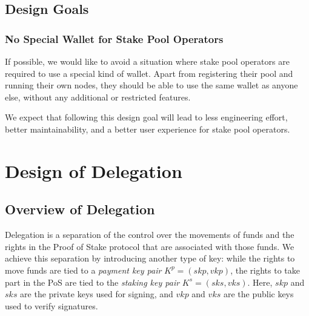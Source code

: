 \documentclass[11pt,a4paper]{article}
\begin{document}
\subsection{Design Goals}
\label{design-goals}

\subsubsection{No Special Wallet for Stake Pool Operators}
\label{no-special-wallet-for-stake-pool-operators}

If possible, we would like to avoid a situation where stake pool
operators are required to use a special kind of wallet. Apart from
registering their pool and running their own nodes, they should be able
to use the same wallet as anyone else, without any additional or
restricted features.

We expect that following this design goal will lead to less engineering
effort, better maintainability, and a better user experience for stake
pool operators.

\section{Design of Delegation}
\label{design-of-delegation}

\newcommand{\hash}[1]{\mathcal{H}(#1)}

\subsection{Overview of Delegation}
\label{overview-of-delegation}

Delegation is a separation of the control over the movements of funds
and the rights in the Proof of Stake protocol that are associated with
those funds. We achieve this separation by introducing another type of
key: while the rights to move funds are tied to a \emph{payment key
pair} \(K^p=(skp, vkp)\), the rights to take part in the PoS are tied to
the \emph{staking key pair} \(K^s=(sks, vks)\). Here, \(skp\) and
\(sks\) are the private keys used for signing, and \(vkp\) and \(vks\)
are the public keys used to verify signatures.
\end{document}
